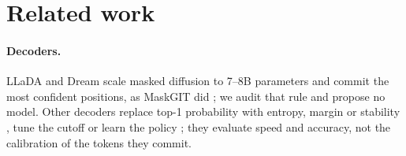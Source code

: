
\section{Related work}
\label{sec:related}

\paragraph{Decoders.}
LLaDA and Dream \citep{nie2025llada,ye2025dream} scale masked diffusion \citep{sahoo2024mdlm}
to 7--8B parameters and commit the most confident positions, as MaskGIT did
\citep{chang2022maskgit}; we audit that rule and propose no model. Other decoders replace top-1
probability \citep{kim2025worst} with entropy, margin or stability
\citep{benhamu2025entropy,kim2025klass}, tune the cutoff \citep{wu2025fastdllm,shen2025osdt} or
learn the policy \citep{jazbec2026learning}; they evaluate speed and accuracy, not the
calibration of the tokens they commit.

